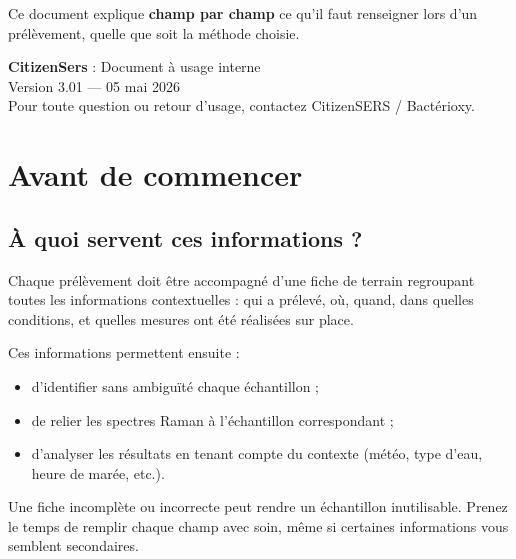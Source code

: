 \documentclass[12pt, a4paper]{article}
\begin{document}
\begin{titlepage}
  \begin{tcolorbox}[
    enhanced, colback=mainblue!5!white, colframe=mainblue!50!black,
    width=0.82\linewidth, arc=5pt, boxrule=0.8pt,
    left=10pt, right=10pt, top=8pt, bottom=8pt
  ]
    \centering
    Ce document explique \textbf{champ par champ} ce qu'il faut
    renseigner lors d'un prélèvement, quelle que soit la méthode choisie.
  \end{tcolorbox}

  \vfill

  {\color{darkgray}\small
    \textbf{CitizenSers} : Document à usage interne\\[4pt]
    Version 3.01 — 05 mai 2026\\[6pt]
    Pour toute question ou retour d'usage, contactez CitizenSERS / Bactérioxy.
  }
\end{titlepage}

\newpage
\tableofcontents
\newpage

\section{Avant de commencer}

\subsection{À quoi servent ces informations ?}

Chaque prélèvement doit être accompagné d'une fiche de terrain
regroupant toutes les informations contextuelles : qui a prélevé,
où, quand, dans quelles conditions, et quelles mesures ont été
réalisées sur place.

Ces informations permettent ensuite :
\begin{itemize}
  \item d'identifier sans ambiguïté chaque échantillon ;
  \item de relier les spectres Raman à l'échantillon correspondant ;
  \item d'analyser les résultats en tenant compte du contexte
        (météo, type d'eau, heure de marée, etc.).
\end{itemize}

\begin{attention}
  Une fiche incomplète ou incorrecte peut rendre un échantillon
  inutilisable. Prenez le temps de remplir chaque champ avec soin,
  même si certaines informations vous semblent secondaires.
\end{attention}
\end{document}
